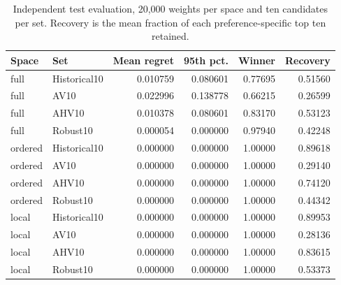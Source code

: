 \begin{table}[tbp]\caption{Independent test evaluation, 20,000 weights per space and ten candidates per set. Recovery is the mean fraction of each preference-specific top ten retained.}\label{tab:evaluation}\centering
\small
\begin{tabular}{llrrrr}\toprule
Space & Set & Mean regret & 95th pct. & Winner & Recovery\\\midrule
full & Historical10 & 0.010759 & 0.080601 & 0.77695 & 0.51560\\
full & AV10 & 0.022996 & 0.138778 & 0.66215 & 0.26599\\
full & AHV10 & 0.010378 & 0.080601 & 0.83170 & 0.53123\\
full & Robust10 & 0.000054 & 0.000000 & 0.97940 & 0.42248\\
ordered & Historical10 & 0.000000 & 0.000000 & 1.00000 & 0.89618\\
ordered & AV10 & 0.000000 & 0.000000 & 1.00000 & 0.29140\\
ordered & AHV10 & 0.000000 & 0.000000 & 1.00000 & 0.74120\\
ordered & Robust10 & 0.000000 & 0.000000 & 1.00000 & 0.44342\\
local & Historical10 & 0.000000 & 0.000000 & 1.00000 & 0.89953\\
local & AV10 & 0.000000 & 0.000000 & 1.00000 & 0.28136\\
local & AHV10 & 0.000000 & 0.000000 & 1.00000 & 0.83615\\
local & Robust10 & 0.000000 & 0.000000 & 1.00000 & 0.53373\\
\bottomrule\end{tabular}

\end{table}
